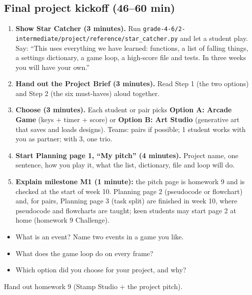 \subsection{Final project kickoff (46--60 min)}
\begin{enumerate}[leftmargin=1.4em]
  \item \textbf{Show Star Catcher (3 minutes).} Run \texttt{grade-4-6/2-intermediate/project/reference/star\_catcher.py} and let a student play.
        Say: \enquote{This uses everything we have learned: functions, a list of falling things, a settings dictionary, a game loop, a high-score file and tests.
        In three weeks you will have your own.}
  \item \textbf{Hand out the Project Brief (3 minutes).} Read Step 1 (the two options) and Step 2 (the six must-haves) aloud together.
  \item \textbf{Choose (3 minutes).} Each student or pair picks \textbf{Option A: Arcade Game} (keys + timer + score) or \textbf{Option B: Art Studio}
        (generative art that saves and loads designs). Teams: pairs if possible; 1 student works with you as partner; with 3, one trio.
  \item \textbf{Start Planning page 1, \enquote{My pitch} (4 minutes).} Project name, one sentence, how you play it, what the list, dictionary, file and loop will do.
  \item \textbf{Explain milestone M1 (1 minute):} the pitch page is homework 9 and is checked at the start of week 10. Planning page 2
        (pseudocode or flowchart) and, for pairs, Planning page 3 (task split) are finished in week 10, where pseudocode and flowcharts are taught;
        keen students may start page 2 at home (homework 9 Challenge).
\end{enumerate}

\begin{reflection}
\begin{itemize}[leftmargin=1.2em]
  \item What is an event? Name two events in a game you like.
  \item What does the game loop do on every frame?
  \item Which option did you choose for your project, and why?
\end{itemize}
\end{reflection}
Hand out homework 9 (Stamp Studio + the project pitch).

